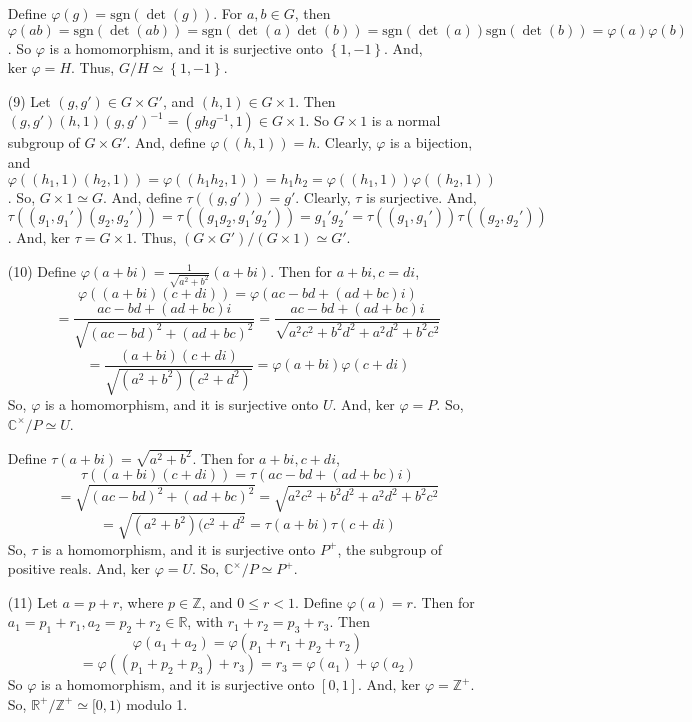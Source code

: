 \documentclass[12pt]{article}
\begin{document}
\begin{itemize}
Define $\varphi(g) = \text{sgn}(\det(g))$. For $a, b \in G$, then $\varphi(ab) = \text{sgn}(\det(ab)) = \text{sgn}(\det(a)\det(b)) = \text{sgn}(\det(a))\text{sgn}(\det(b)) = \varphi(a)\varphi(b)$. So $\varphi$ is a homomorphism, and it is surjective onto $\left\lbrace 1, -1 \right\rbrace$. And, $\text{ker }\varphi = H$. Thus, $G/H \simeq \left\lbrace 1, -1 \right\rbrace$.
\item[(9)]
Let $(g, g') \in G \times G'$, and $(h, 1) \in G \times 1$. Then $(g, g')(h, 1)(g, g')^{-1} = (ghg^{-1}, 1) \in G \times 1$. So $G \times 1$ is a normal subgroup of $G \times G'$. And, define $\varphi((h, 1)) = h$. Clearly, $\varphi$ is a bijection, and $\varphi((h_1, 1)(h_2, 1)) = \varphi((h_1h_2, 1)) = h_1h_2 = \varphi((h_1, 1))\varphi((h_2, 1))$. So, $G \times 1 \simeq G$. And, define $\tau((g, g')) = g'$. Clearly, $\tau$ is surjective. And, $\tau((g_1, g_1')(g_2, g_2')) = \tau((g_1g_2, g_1'g_2')) = g_1'g_2' = \tau((g_1, g_1'))\tau((g_2, g_2'))$. And, $\text{ker }\tau = G \times 1$. Thus, $(G \times G')/(G \times 1) \simeq G'$.
\item[(10)]
Define $\varphi(a + bi) = \frac{1}{\sqrt{a^2+b^2}}(a + bi)$. Then for $a + bi, c = di$,
$$\varphi((a+bi)(c+di)) = \varphi(ac - bd + (ad + bc)i)$$
$$ = \frac{ac - bd + (ad + bc)i}{\sqrt{(ac - bd)^2 + (ad + bc)^2}} = \frac{ac - bd + (ad + bc)i}{\sqrt{a^2c^2 + b^2d^2 + a^2d^2 + b^2c^2}}$$
$$ = \frac{(a + bi)(c + di)}{\sqrt{(a^2 + b^2)(c^2+d^2)}} = \varphi(a+bi)\varphi(c+di)$$
So, $\varphi$ is a homomorphism, and it is surjective onto $U$. And, $\text{ker }\varphi = P$. So, $\mathbb{C}^\times/P \simeq U$.

Define $\tau(a+bi) = \sqrt{a^2 + b^2}$. Then for $a+bi, c+di$,
$$\tau((a+bi)(c+di)) = \tau(ac - bd + (ad + bc)i)$$
$$= \sqrt{(ac - bd)^2 + (ad + bc)^2} = \sqrt{a^2c^2 + b^2d^2 + a^2d^2 + b^2c^2}$$
$$= \sqrt{(a^2+b^2)(c^2+d^2} = \tau(a+bi)\tau(c+di)$$
So, $\tau$ is a homomorphism, and it is surjective onto $P^+$, the subgroup of positive reals. And, $\text{ker }\varphi = U$. So, $\mathbb{C}^\times/P \simeq P^+$.
\item[(11)]
Let $a = p + r$, where $p \in \mathbb{Z}$, and $0 \leq r < 1$. Define $\varphi(a) = r$. Then for $a_1 = p_1 + r_1, a_2 = p_2 + r_2 \in \mathbb{R}$, with $r_1 + r_2 = p_3 + r_3$. Then
$$\varphi(a_1 + a_2) = \varphi(p_1 + r_1 + p_2 + r_2)$$
$$= \varphi((p_1 + p_2 + p_3) + r_3) = r_3 = \varphi(a_1) + \varphi(a_2)$$
So $\varphi$ is a homomorphism, and it is surjective onto $[0, 1]$. And, $\text{ker }\varphi = \mathbb{Z}^+$. So, $\mathbb{R}^+/\mathbb{Z}^+ \simeq [0, 1)$ modulo 1.


\end{itemize}
\end{document}
